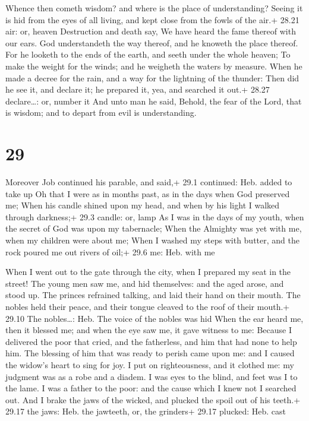  Whence then cometh wisdom? and where is the place of
understanding?  Seeing it is hid from the eyes of all
living, and kept close from the fowls of the air.+ 28.21 air: or, heaven
 Destruction and death say, We have heard the fame thereof
with our ears.  God understandeth the way thereof, and he
knoweth the place thereof.  For he looketh to the ends of
the earth, and seeth under the whole heaven;  To make the
weight for the winds; and he weigheth the waters by measure.
 When he made a decree for the rain, and a way for the
lightning of the thunder:  Then did he see it, and declare
it; he prepared it, yea, and searched it out.+ 28.27 declare\ldots: or,
number it  And unto man he said, Behold, the fear of the
Lord, that is wisdom; and to depart from evil is understanding.

\hypertarget{section-28}{%
\section{29}\label{section-28}}

 Moreover Job continued his parable, and said,+ 29.1
continued: Heb. added to take up  Oh that I were as in
months past, as in the days when God preserved me;  When his
candle shined upon my head, and when by his light I walked through
darkness;+ 29.3 candle: or, lamp  As I was in the days of my
youth, when the secret of God was upon my tabernacle;  When
the Almighty was yet with me, when my children were about me;
 When I washed my steps with butter, and the rock poured me
out rivers of oil;+ 29.6 me: Heb. with me

 When I went out to the gate through the city, when I
prepared my seat in the street!  The young men saw me, and
hid themselves: and the aged arose, and stood up.  The
princes refrained talking, and laid their hand on their mouth.
 The nobles held their peace, and their tongue cleaved to
the roof of their mouth.+ 29.10 The nobles\ldots: Heb. The voice of the
nobles was hid  When the ear heard me, then it blessed me;
and when the eye saw me, it gave witness to me:  Because I
delivered the poor that cried, and the fatherless, and him that had none
to help him.  The blessing of him that was ready to perish
came upon me: and I caused the widow's heart to sing for joy.
 I put on righteousness, and it clothed me: my judgment was
as a robe and a diadem.  I was eyes to the blind, and feet
was I to the lame.  I was a father to the poor: and the
cause which I knew not I searched out.  And I brake the
jaws of the wicked, and plucked the spoil out of his teeth.+ 29.17 the
jaws: Heb. the jawteeth, or, the grinders+ 29.17 plucked: Heb. cast

